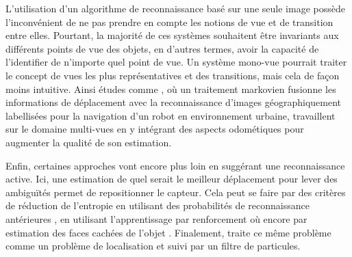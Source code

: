 L'utilisation d'un algorithme de reconnaissance basé sur une seule image possède l'inconvénient de ne pas prendre en compte les notions de vue et de transition entre elles. Pourtant, la majorité de ces systèmes souhaitent être invariants aux différents points de vue des objets, en d'autres termes, avoir la capacité de l'identifier de n'importe quel point de vue. Un système mono-vue pourrait traiter le concept de vues les plus représentatives et des transitions, mais cela de façon moins intuitive. Ainsi études comme \cite{le2014global}, où un traitement markovien fusionne les informations de déplacement avec la reconnaissance d'images géographiquement labellisées pour la navigation d'un robot en environnement urbaine, travaillent sur le domaine multi-vues en y intégrant des aspects odométiques pour augmenter la qualité de son estimation.
  
Enfin, certaines approches vont encore plus loin en suggérant une reconnaissance active. Ici, une estimation de quel serait le meilleur déplacement pour lever des ambiguïtés permet de repositionner le capteur. Cela peut se faire par des critères de réduction de l'entropie en utilisant des probabilités de reconnaissance antérieures \cite{borotschnig1998active}, en utilisant l'apprentissage par renforcement \cite{borji2009learning} où encore par estimation des faces cachées de l'objet \cite{banta2000next}. Finalement, \cite{browatzki2012active} traite ce même problème comme un problème de localisation et suivi par un filtre de particules.


%
%



